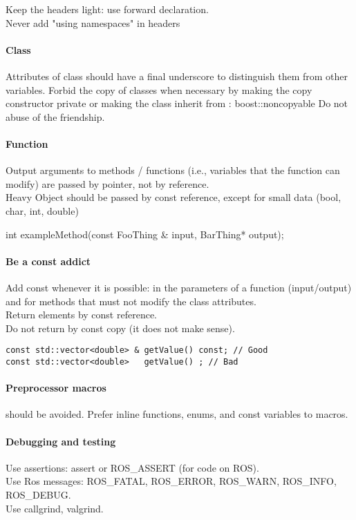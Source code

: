 Keep the headers light: use forward declaration.\\
Never add "using namespaces" in headers

\paragraph{Class}
Attributes of class should have a final underscore to distinguish them from other variables.
Forbid the copy of classes when necessary by making the copy constructor private or making the class inherit from : boost::noncopyable
Do not abuse of the friendship.

\paragraph{Function}
Output arguments to methods / functions (i.e., variables that the function can modify) are passed by pointer, not by reference.\\
Heavy Object should be passed by const reference, except for small data (bool, char, int, double)\\
\begin{tt}
int exampleMethod(const FooThing \& input, BarThing* output);
\end{tt}

\paragraph{Be a const addict} Add const whenever it is possible: in the parameters of a function (input/output) and for methods that must not modify the class attributes.\\
Return elements by const reference.\\
Do not return by const copy (it does not make sense).
\begin{verbatim}
const std::vector<double> & getValue() const; // Good
const std::vector<double>   getValue() ; // Bad
\end{verbatim}


\paragraph{Preprocessor macros} should be avoided. Prefer inline functions, enums, and const variables to macros.

\paragraph{Debugging and testing}
Use assertions: assert or ROS\_ASSERT (for code on ROS).\\
Use Ros messages: ROS\_FATAL, ROS\_ERROR, ROS\_WARN, ROS\_INFO, ROS\_DEBUG.\\
Use callgrind, valgrind.

